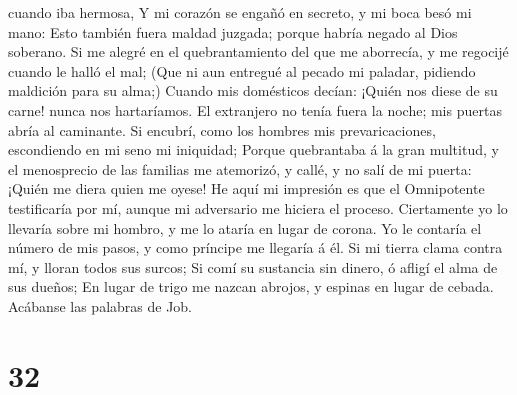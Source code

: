 cuando iba hermosa,  Y mi corazón se engañó en secreto, y
mi boca besó mi mano:  Esto también fuera maldad juzgada;
porque habría negado al Dios soberano.  Si me alegré en
el quebrantamiento del que me aborrecía, y me regocijé cuando le halló
el mal;  (Que ni aun entregué al pecado mi paladar,
pidiendo maldición para su alma;)  Cuando mis domésticos
decían: ¡Quién nos diese de su carne! nunca nos hartaríamos.
 El extranjero no tenía fuera la noche; mis puertas abría
al caminante.  Si encubrí, como los hombres mis
prevaricaciones, escondiendo en mi seno mi iniquidad; 
Porque quebrantaba á la gran multitud, y el menosprecio de las familias
me atemorizó, y callé, y no salí de mi puerta:  ¡Quién me
diera quien me oyese! He aquí mi impresión es que el Omnipotente
testificaría por mí, aunque mi adversario me hiciera el proceso.
 Ciertamente yo lo llevaría sobre mi hombro, y me lo
ataría en lugar de corona.  Yo le contaría el número de
mis pasos, y como príncipe me llegaría á él.  Si mi
tierra clama contra mí, y lloran todos sus surcos;  Si
comí su sustancia sin dinero, ó afligí el alma de sus dueños;
 En lugar de trigo me nazcan abrojos, y espinas en lugar
de cebada. Acábanse las palabras de Job.

\hypertarget{section-31}{%
\section{32}\label{section-31}}

